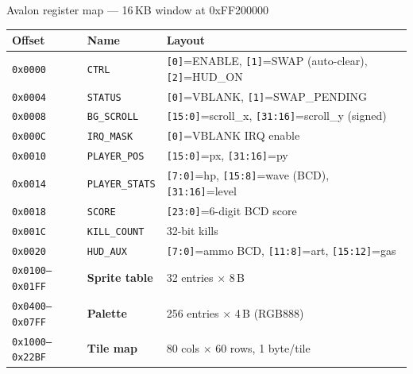 \documentclass[aspectratio=169,11pt]{beamer}
\begin{document}
\begin{frame}{Avalon register map --- 16\,KB window at 0xFF200000}
\centering
\small
\renewcommand{\arraystretch}{1.15}
\begin{tabular}{lll}
\toprule
\textbf{Offset} & \textbf{Name} & \textbf{Layout} \\
\midrule
\texttt{0x0000} & \texttt{CTRL}         & \texttt{[0]}=ENABLE, \texttt{[1]}=SWAP (auto-clear), \texttt{[2]}=HUD\_ON \\
\texttt{0x0004} & \texttt{STATUS}       & \texttt{[0]}=VBLANK, \texttt{[1]}=SWAP\_PENDING \\
\texttt{0x0008} & \texttt{BG\_SCROLL}   & \texttt{[15:0]}=scroll\_x, \texttt{[31:16]}=scroll\_y (signed) \\
\texttt{0x000C} & \texttt{IRQ\_MASK}    & \texttt{[0]}=VBLANK IRQ enable \\
\texttt{0x0010} & \texttt{PLAYER\_POS}  & \texttt{[15:0]}=px, \texttt{[31:16]}=py \\
\texttt{0x0014} & \texttt{PLAYER\_STATS}& \texttt{[7:0]}=hp, \texttt{[15:8]}=wave (BCD), \texttt{[31:16]}=level \\
\texttt{0x0018} & \texttt{SCORE}        & \texttt{[23:0]}=6-digit BCD score \\
\texttt{0x001C} & \texttt{KILL\_COUNT}  & 32-bit kills \\
\texttt{0x0020} & \texttt{HUD\_AUX}     & \texttt{[7:0]}=ammo BCD, \texttt{[11:8]}=art, \texttt{[15:12]}=gas \\
\midrule
\texttt{0x0100--0x01FF} & \textbf{Sprite table}  & 32 entries $\times$ 8\,B \\
\texttt{0x0400--0x07FF} & \textbf{Palette}       & 256 entries $\times$ 4\,B (RGB888) \\
\texttt{0x1000--0x22BF} & \textbf{Tile map}      & 80 cols $\times$ 60 rows, 1 byte/tile \\
\bottomrule
\end{tabular}
\end{frame}
\end{document}
